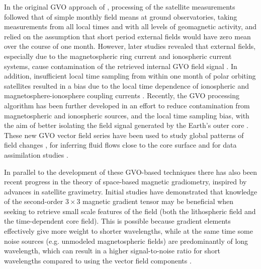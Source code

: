 \documentclass[extra,mreferee]{gji}
\begin{document}
In the original GVO approach of , processing of the satellite measurements followed that of simple monthly field means at ground observatories, taking measurements from all local times and with all levels of geomagnetic activity, and relied on the assumption that short period external fields would have zero mean over the course of one month. However, later studies revealed that external fields, especially  due to the magnetospheric ring current and ionospheric current systems, cause contamination of the retrieved internal GVO field signal  \citep{Olsen_Mandea_2007,Beggan_etal_2009,Domingos_etal_2019}. In addition, insufficient local time sampling from within one month of polar orbiting satellites resulted in a bias due to the local time dependence of ionospheric and magnetosphere-ionosphere coupling currents \citep{Shore_2013}. Recently, the GVO processing algorithm has been further developed in an effort to reduce contamination from magnetospheric and ionospheric sources, and the local time sampling bias, with the aim of better isolating the field signal generated by the Earth's outer core \citep{Hammer_etal_2021a}. These new GVO vector field series have been used to study global patterns of field changes \citep{Hammer_etal_2021a,Hammer_etal_2021b}, for inferring fluid flows close to the core surface \citep{Kloss_Finlay_2019,Rogers_etal_2019} and for data assimilation studies \citep{Barrois_etal_2018,Huder_etal_2020}. 

In parallel to the development of these GVO-based techniques there has also been recent progress in the theory of space-based magnetic gradiometry, inspired by advances in satellite gravimetry. Initial studies have demonstrated that knowledge of the second-order $3\times3$ magnetic gradient tensor may be beneficial when seeking to retrieve small scale features of the field (both the lithospheric field and the time-dependent core field). This is possible because gradient elements effectively give more weight to shorter wavelengths, while at the same time some noise sources (e.g. unmodeled magnetospheric fields) are predominantly of long wavelength, which can result in a higher signal-to-noise ratio for short wavelengths compared to using the vector field components \citep{kotsiaros_Olsen_2012,kotsiaros_Olsen_2014}. 
\end{document}
